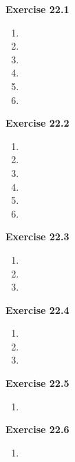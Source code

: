 




\textbf{Exercise 22.1}
\begin{enumerate}
    \item 
    \item 
    \item 
    \item 
    \item 
    \item 
\end{enumerate}

\textbf{Exercise 22.2}
\begin{enumerate}
    \item 
    \item 
    \item 
    \item 
    \item 
    \item 
\end{enumerate}

\textbf{Exercise 22.3}
\begin{enumerate}
    \item 
    \item 
    \item 
\end{enumerate}

\textbf{Exercise 22.4}
\begin{enumerate}
    \item 
    \item 
    \item 
\end{enumerate}

\textbf{Exercise 22.5}
\begin{enumerate}
    \item 
\end{enumerate}

\textbf{Exercise 22.6}
\begin{enumerate}
    \item 
\end{enumerate}

